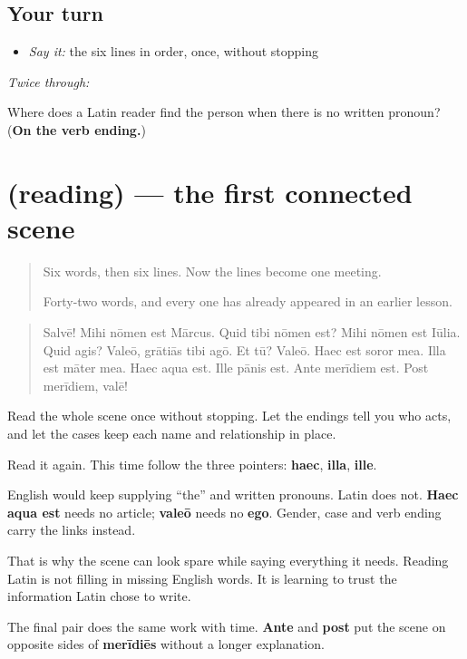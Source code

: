 \subsection*{Your turn}
\begin{itemize}
\raggedright
  \item \emph{Say it:} the six lines in order, once, without stopping
\end{itemize}

\emph{Twice through:}

\begin{tcolorbox}[breakable,colback=teal!4,colframe=teal!35!black,title={Before you move on}]
Where does a Latin reader find the person when there is no written pronoun? (\textbf{On the verb ending.})
\end{tcolorbox}
\section[(reading)]{(reading) — the first connected scene}

\label{lesson:LA-C58-prima-lectio}



\begin{quote}
Six words, then six lines. Now the lines become one meeting.

Forty-two words, and every one has already appeared in an earlier lesson.
\end{quote}

\begin{tcolorbox}[breakable,skin=enhanced,colback=orange!6,colframe=orange!45!black,boxrule=0.5pt,arc=1mm,left=6pt,right=6pt,top=4pt,bottom=4pt,fonttitle=\bfseries,title={Read this}]
\begin{quote}
Salvē! Mihi nōmen est Mārcus. Quid tibi nōmen est? Mihi nōmen est Iūlia. Quid agis? Valeō, grātiās tibi agō. Et tū? Valeō. Haec est soror mea. Illa est māter mea. Haec aqua est. Ille pānis est. Ante merīdiem est. Post merīdiem, valē!
\end{quote}

Read the whole scene once without stopping. Let the endings tell you who acts, and let the cases keep each name and relationship in place.

Read it again. This time follow the three pointers: \textbf{haec}, \textbf{illa}, \textbf{ille}.
\end{tcolorbox}

\begin{grammarlens}[title={Grammar Lens: Latin holds together without articles}]
English would keep supplying “the” and written pronouns. Latin does not. \textbf{Haec aqua est} needs no article; \textbf{valeō} needs no \textbf{ego}. Gender, case and verb ending carry the links instead.

That is why the scene can look spare while saying everything it needs. Reading Latin is not filling in missing English words. It is learning to trust the information Latin chose to write.

The final pair does the same work with time. \textbf{Ante} and \textbf{post} put the scene on opposite sides of \textbf{merīdiēs} without a longer explanation.
\end{grammarlens}

